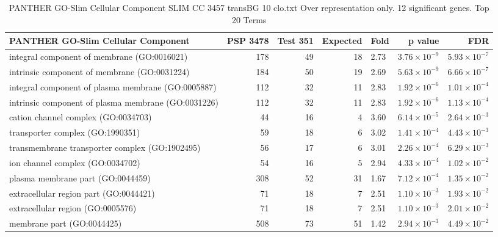 \begin{table}[ht]
\centering
\begin{adjustbox}{width=\textwidth}
\begin{tabular}{lrrrlrr}
  \hline
PANTHER GO-Slim Cellular Component & PSP 3478 & Test 351 & Expected & Fold & p value & FDR \\ 
  \hline
integral component of membrane (GO:0016021) & 178 & 49 & 18 & 2.73 & $3.76 \times 10^{-9}$ & $5.93 \times 10^{-7}$ \\ 
  intrinsic component of membrane (GO:0031224) & 184 & 50 & 19 & 2.69 & $5.63 \times 10^{-9}$ & $6.66 \times 10^{-7}$ \\ 
  integral component of plasma membrane (GO:0005887) & 112 & 32 & 11 & 2.83 & $1.92 \times 10^{-6}$ & $1.01 \times 10^{-4}$ \\ 
  intrinsic component of plasma membrane (GO:0031226) & 112 & 32 & 11 & 2.83 & $1.92 \times 10^{-6}$ & $1.13 \times 10^{-4}$ \\ 
  cation channel complex (GO:0034703) & 44 & 16 & 4 & 3.60 & $6.14 \times 10^{-5}$ & $2.64 \times 10^{-3}$ \\ 
  transporter complex (GO:1990351) & 59 & 18 & 6 & 3.02 & $1.41 \times 10^{-4}$ & $4.43 \times 10^{-3}$ \\ 
  transmembrane transporter complex (GO:1902495) & 56 & 17 & 6 & 3.01 & $2.26 \times 10^{-4}$ & $6.29 \times 10^{-3}$ \\ 
  ion channel complex (GO:0034702) & 54 & 16 & 5 & 2.94 & $4.33 \times 10^{-4}$ & $1.02 \times 10^{-2}$ \\ 
  plasma membrane part (GO:0044459) & 308 & 52 & 31 & 1.67 & $7.12 \times 10^{-4}$ & $1.35 \times 10^{-2}$ \\ 
  extracellular region part (GO:0044421) & 71 & 18 & 7 & 2.51 & $1.10 \times 10^{-3}$ & $1.93 \times 10^{-2}$ \\ 
  extracellular region (GO:0005576) & 71 & 18 & 7 & 2.51 & $1.10 \times 10^{-3}$ & $2.01 \times 10^{-2}$ \\ 
  membrane part (GO:0044425) & 508 & 73 & 51 & 1.42 & $2.94 \times 10^{-3}$ & $4.49 \times 10^{-2}$ \\ 
   \hline
\end{tabular}
\end{adjustbox}
\caption{PANTHER GO-Slim Cellular Component SLIM CC 3457 transBG 10 clo.txt Over representation only. 12 significant genes. Top 20 Terms} 
\label{tab:PANTHER GO-Slim Cellular Component SLIM CC 3457 transBG 10 clo.txt Over representation only. 12 significant genes. Top 20 Terms}
\end{table}

